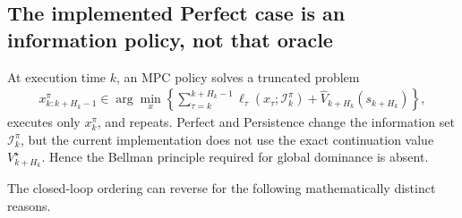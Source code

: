 \documentclass[final,5p,times]{elsarticle}
\begin{document}
\subsection{The implemented Perfect case is an information policy, not that oracle}
At execution time $k$, an MPC policy solves a truncated problem
\begin{align}
x_{k:k+H_k-1}^{\pi}\in\arg\min_x
\left\{\sum_{\tau=k}^{k+H_k-1}\ell_\tau(x_\tau;\mathcal I_k^{\pi})+
\widehat V_{k+H_k}(s_{k+H_k})\right\},
\label{eq:mpc_bellman}
\end{align}
executes only $x_k^{\pi}$, and repeats. Perfect and Persistence change the information set $\mathcal I_k^{\pi}$, but the current implementation does not use the exact continuation value $V_{k+H_k}^{\star}$. Hence the Bellman principle required for global dominance is absent.

The closed-loop ordering can reverse for the following mathematically distinct reasons.
\end{document}
